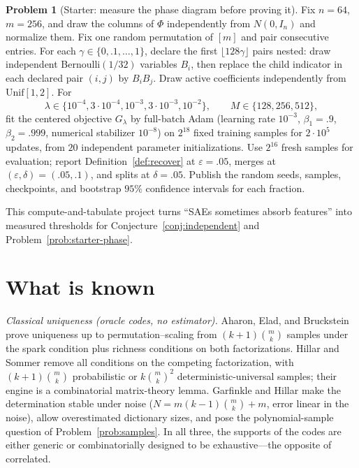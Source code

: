 \documentclass[11pt]{amsart}
\theoremstyle{plain}
\theoremstyle{definition}
\newtheorem{problem}[theorem]{Problem}
\begin{document}
\begin{problem}[Starter: measure the phase diagram before proving it]\label{prob:starter-numerics}
Fix $n=64$, $m=256$, and draw the columns of $\Phi$ independently from $N(0,I_n)$ and normalize them. Fix one random permutation of $[m]$ and pair consecutive entries. For each $\gamma\in\{0,.1,\dots,1\}$, declare the first $\lfloor128\gamma\rfloor$ pairs nested: draw independent Bernoulli$(1/32)$ variables $B_i$, then replace the child indicator in each declared pair $(i,j)$ by $B_iB_j$. Draw active coefficients independently from $\mathrm{Unif}[1,2]$. For
\[
\lambda\in\{10^{-4},3\cdot10^{-4},10^{-3},3\cdot10^{-3},10^{-2}\},
\qquad M\in\{128,256,512\},
\]
fit the centered objective $G_\lambda$ by full-batch Adam (learning rate $10^{-3}$, $\beta_1=.9$, $\beta_2=.999$, numerical stabilizer $10^{-8}$) on $2^{18}$ fixed training samples for $2\cdot10^5$ updates, from $20$ independent parameter initializations. Use $2^{16}$ fresh samples for evaluation; report Definition~\ref{def:recover} at $\varepsilon=.05$, merges at $(\varepsilon,\delta)=(.05,.1)$, and splits at $\delta=.05$. Publish the random seeds, samples, checkpoints, and bootstrap $95\%$ confidence intervals for each fraction.
\end{problem}

This compute-and-tabulate project turns ``SAEs sometimes absorb features'' into measured thresholds for Conjecture~\ref{conj:independent} and Problem~\ref{prob:starter-phase}.

\section{What is known}\label{sec:known}

\emph{Classical uniqueness (oracle codes, no estimator).} Aharon, Elad, and Bruckstein \cite{aharon2006} prove uniqueness up to permutation--scaling from $(k+1)\binom{m}{k}$ samples under the spark condition plus richness conditions on both factorizations. Hillar and Sommer \cite{hillar2015} remove all conditions on the competing factorization, with $(k+1)\binom{m}{k}$ probabilistic or $k\binom{m}{k}^2$ deterministic-universal samples; their engine is a combinatorial matrix-theory lemma. Garfinkle and Hillar \cite{garfinkle2019} make the determination stable under noise ($N=m(k-1)\binom{m}{k}+m$, error linear in the noise), allow overestimated dictionary sizes, and pose the polynomial-sample question of Problem~\ref{prob:samples}. In all three, the supports of the codes are either generic or combinatorially designed to be exhaustive---the opposite of correlated.
\end{document}
